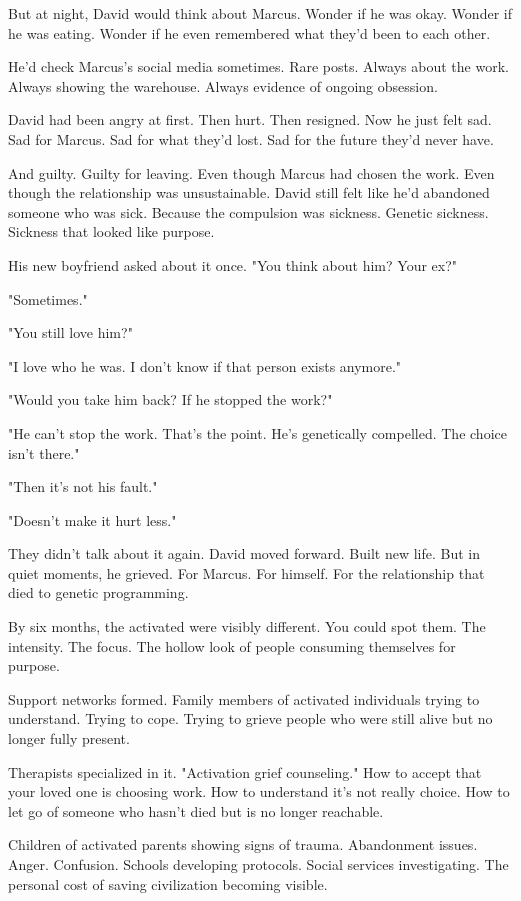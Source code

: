 But at night, David would think about Marcus. Wonder if he was okay. Wonder if he was eating. Wonder if he even remembered what they'd been to each other.

He'd check Marcus's social media sometimes. Rare posts. Always about the work. Always showing the warehouse. Always evidence of ongoing obsession.

David had been angry at first. Then hurt. Then resigned. Now he just felt sad. Sad for Marcus. Sad for what they'd lost. Sad for the future they'd never have.

And guilty. Guilty for leaving. Even though Marcus had chosen the work. Even though the relationship was unsustainable. David still felt like he'd abandoned someone who was sick. Because the compulsion was sickness. Genetic sickness. Sickness that looked like purpose.

His new boyfriend asked about it once. "You think about him? Your ex?"

"Sometimes."

"You still love him?"

"I love who he was. I don't know if that person exists anymore."

"Would you take him back? If he stopped the work?"

"He can't stop the work. That's the point. He's genetically compelled. The choice isn't there."

"Then it's not his fault."

"Doesn't make it hurt less."

They didn't talk about it again. David moved forward. Built new life. But in quiet moments, he grieved. For Marcus. For himself. For the relationship that died to genetic programming.

\scenebreak

By six months, the activated were visibly different. You could spot them. The intensity. The focus. The hollow look of people consuming themselves for purpose.

Support networks formed. Family members of activated individuals trying to understand. Trying to cope. Trying to grieve people who were still alive but no longer fully present.

Therapists specialized in it. "Activation grief counseling." How to accept that your loved one is choosing work. How to understand it's not really choice. How to let go of someone who hasn't died but is no longer reachable.

Children of activated parents showing signs of trauma. Abandonment issues. Anger. Confusion. Schools developing protocols. Social services investigating. The personal cost of saving civilization becoming visible.

